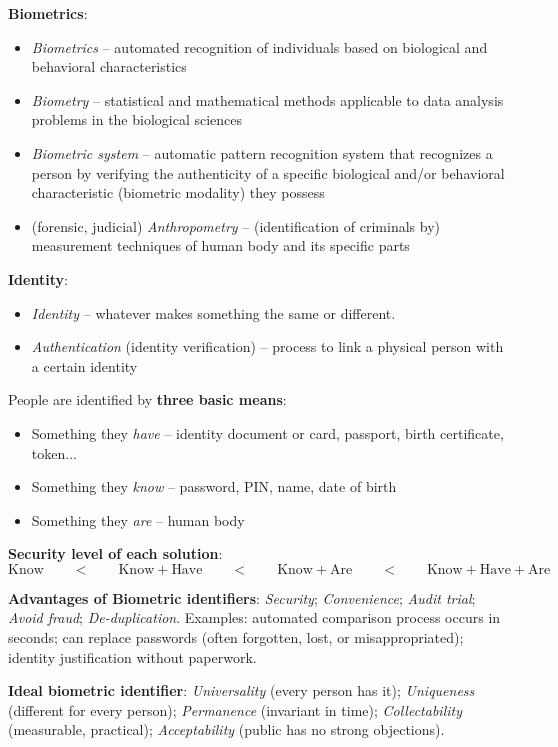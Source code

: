 \documentclass[a4paper]{article}
\begin{document}
      \textbf{Biometrics}:
      \begin{itemize}
        \item \emph{Biometrics} -- automated recognition of individuals based on biological and behavioral characteristics
        \item \emph{Biometry} -- statistical and mathematical methods applicable to data analysis problems in the biological sciences
        \item \emph{Biometric system} -- automatic pattern recognition system that recognizes a person by verifying the authenticity of a specific biological and/or behavioral characteristic (biometric modality) they possess
        \item (forensic, judicial) \emph{Anthropometry} -- (identification of criminals by) measurement techniques of human body and its specific parts
      \end{itemize}
      \textbf{Identity}:
      \begin{itemize}
        \item \emph{Identity} -- whatever makes something the same or different.
        \item \emph{Authentication} (identity verification) -- process to link a physical person with a certain identity
      \end{itemize}

      People are identified by \textbf{three basic means}:
      \begin{itemize}
        \item Something they \emph{have} -- identity document or card, passport, birth certificate, token...
        \item Something they \emph{know} -- password, PIN, name, date of birth
        \item Something they \emph{are} -- human body
      \end{itemize}

      \textbf{Security level of each solution}:
      $$\text{Know} \qquad<\qquad \text{Know}+\text{Have} \qquad<\qquad \text{Know}+\text{Are} \qquad<\qquad \text{Know}+\text{Have}+\text{Are}$$

      \textbf{Advantages of Biometric identifiers}: \emph{Security}; \emph{Convenience}; \emph{Audit trial}; \emph{Avoid fraud}; \emph{De-duplication}. Examples: automated comparison process occurs in seconds; can replace passwords (often forgotten, lost, or misappropriated); identity justification without paperwork.

      \textbf{Ideal biometric identifier}: \emph{Universality} (every person has it); \emph{Uniqueness} (different for every person); \emph{Permanence} (invariant in time); \emph{Collectability} (measurable, practical); \emph{Acceptability} (public has no strong objections).
\end{document}
